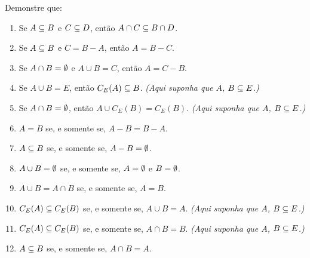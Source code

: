 \documentclass[12pt]{exam}
\begin{document}
\questao{} Demonstre que:
\begin{enumerate}[label={\alph*})]
\item Se $A \subseteq B$ e $C \subseteq D$, ent\~ao $A \cap C \subseteq B \cap D$.

\item Se $A \subseteq B$ e $C = B - A$, ent\~ao $A = B - C$.

\item Se $A \cap B = \emptyset$ e $A \cup B = C$, ent\~ao $A = C - B$.

\item Se $A\cup B = E$, ent\~ao $C_E(A) \subseteq B$. \textit{(Aqui suponha que $A$, $B \subseteq E$.)}

\item Se $A \cap B = \emptyset$, ent\~ao $A \cup C_E(B) = C_E(B)$. \textit{(Aqui suponha que $A$, $B \subseteq E$.)}
  
\item $A = B$ se, e somente se, $A - B = B - A$.

\item $A \subseteq B$ se, e somente se, $A - B = \emptyset$.

\item $A \cup B = \emptyset$ se, e somente se, $A = \emptyset$ e $B = \emptyset$.

\item $A \cup B = A \cap B$ se, e somente se,  $A = B$.

\item $C_E(A) \subseteq C_E(B)$ se, e somente se, $A \cup B = A$. \textit{(Aqui suponha que $A$, $B \subseteq E$.)}

\item $C_E(A) \subseteq C_E(B)$ se, e somente se, $A \cap B = B$. \textit{(Aqui suponha que $A$, $B \subseteq E$.)}

\item $A \subseteq B$ se, e somente se,  $A \cap B = A$.
\end{enumerate}

\vspace{.3cm}
\end{document}
